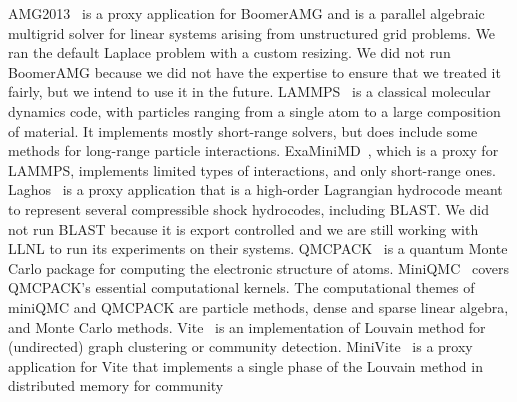 AMG2013~\cite{AMG} is a proxy application for BoomerAMG and is a parallel
algebraic multigrid solver for linear systems arising from unstructured grid
problems.  %
We ran the default Laplace problem with a custom resizing.
We did not run BoomerAMG because we did not have the expertise to 
ensure that we treated it fairly, but we intend to use it in the future.
%
LAMMPS~\cite{LAMMPS} is a classical molecular dynamics code, 
with particles ranging from a single atom to a large composition of material.  
It implements mostly short-range solvers, but does include some methods for long-range particle interactions.  
ExaMiniMD~\cite{ostiExaMiniMD}, which is  
a proxy for LAMMPS, %
implements limited types of interactions, and only short-range ones.
%
Laghos~\cite{Laghos} is a proxy application that is a high-order Lagrangian
hydrocode meant to represent several compressible shock hydrocodes, including BLAST.
We did not
run BLAST because it is export controlled and we are still working with LLNL
to run its experiments on their systems.
%
QMCPACK~\cite{qmcpack} is a quantum Monte Carlo package for computing the electronic structure of atoms. MiniQMC~\cite{richards2018fy18} 
covers QMCPACK's essential computational kernels. The computational themes of miniQMC and QMCPACK are particle methods, dense and sparse linear algebra, and Monte Carlo methods.
%
Vite~\cite{Vite} is an implementation of Louvain method for (undirected)
graph clustering or community detection.  
MiniVite~\cite{miniVite} is a proxy application for Vite that implements a
single phase of the Louvain method in distributed memory for community
